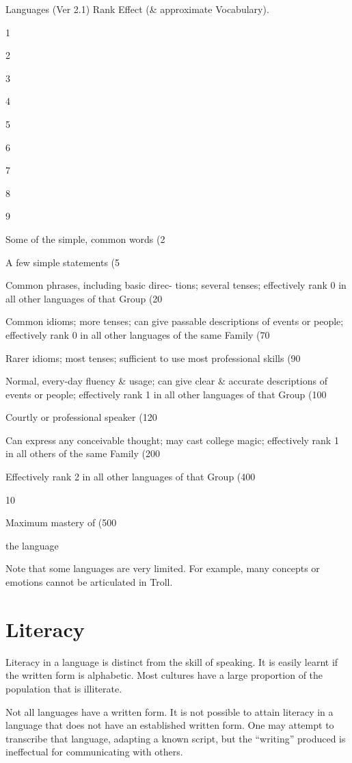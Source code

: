 \begin{Chapter}{Languages (Ver 2.1)}
Rank  Effect (\& approximate Vocabulary). 

1  

2  

3  

4  

5  

6  

7  

8  

9  

Some of the simple, common words (2%

A few simple statements (5%

Common  phrases,  including  basic  direc-
tions; several tenses; effectively rank 0 in 
all other languages of that Group (20%

Common  idioms;  more  tenses;  can  give 
passable descriptions of events or people; 
effectively rank 0 in all other languages of 
the same Family (70%

Rarer  idioms;  most  tenses;  sufficient  to 
use most professional skills (90%

Normal,  every-day  fluency  \&  usage;  can 
give  clear  \&  accurate  descriptions  of 
events or people; effectively rank 1 in all 
other languages of that Group (100%

Courtly or professional speaker (120%

Can  express  any  conceivable  thought; 
may cast college magic; effectively rank 1 
in all others of the same Family (200%

Effectively  rank  2  in  all  other  languages 
of that Group (400%

10  

Maximum  mastery  of 
(500%

the language 

Note that some languages are very limited.  For example, many concepts
or emotions cannot be articulated in Troll.

\section{Literacy}

Literacy in a language is distinct from the skill of speaking.  It is
easily learnt if the written form is alphabetic.  Most cultures have a
large proportion of the population that is illiterate.

Not all languages have a written form.  It is not possible to attain
literacy in a language that does not have an established written form.
One may attempt to transcribe that language, adapting a known script,
but the “writing” produced is ineffectual for communicating with
others.


\end{Chapter}
